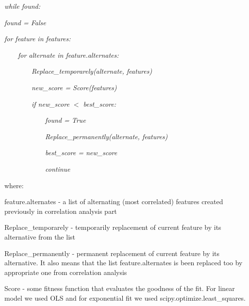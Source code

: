 \documentclass[aps,prl,reprint,amsmath,amssymb,nature]{revtex4-1}
\begin{document}
\textit{while found:}

\textit{found = False}

\textit{for feature in features:}

\ \ \ \ \textit{for alternate in feature.alternates:}

\ \ \ \ \ \ \ \ \textit{Replace\_temporarely(alternate, features)}

\ \ \ \ \ \ \ \ \textit{new\_score = Score(features)}

\ \ \ \ \ \ \ \ \textit{if new\_score $<$ best\_score:}

\ \ \ \ \ \ \ \ \ \ \ \ \textit{found = True}

\ \ \ \ \ \ \ \ \ \ \ \ \textit{Replace\_permanently(alternate, 
features)}

\ \ \ \ \ \ \ \ \ \ \ \ \textit{best\_score = new\_score}

\ \ \ \ \ \ \ \ \ \ \ \ \textit{continue}

where: 

feature.alternates - a list of alternating (most correlated) features 
created previously in correlation analysis part

Replace\_temporarely - temporarily replacement of current feature by its 
alternative from the list

Replace\_permanently - permanent replacement of current feature by its 
alternative. It also means that the list feature.alternates is been 
replaced too by appropriate one from correlation analysis

Score - some fitness function that evaluates the goodness of the fit. 
For linear model we used OLS and for exponential fit we used 
scipy.optimize.least\_squares.


\fi %
\end{document}
